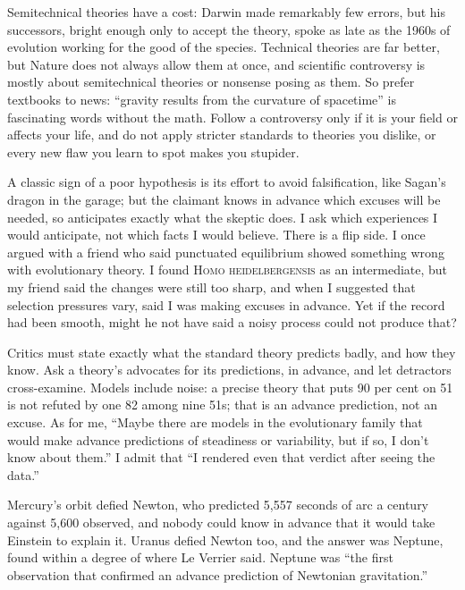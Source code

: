Semitechnical theories have a cost: Darwin made remarkably few errors, but his successors, bright enough only to accept the theory, spoke as late as the 1960s of evolution working for the good of the species. Technical theories are far better, but Nature does not always allow them at once, and scientific controversy is mostly about semitechnical theories or nonsense posing as them. So prefer textbooks to news: ``gravity results from the curvature of spacetime'' is fascinating words without the math. Follow a controversy only if it is your field or affects your life, and do not apply stricter standards to theories you dislike, or every new flaw you learn to spot makes you stupider. 

A classic sign of a poor hypothesis is its effort to avoid falsification, like Sagan's dragon in the garage; but the claimant knows in advance which excuses will be needed, so anticipates exactly what the skeptic does. I ask which experiences I would anticipate, not which facts I would believe. There is a flip side. I once argued with a friend who said punctuated equilibrium showed something wrong with evolutionary theory. I found \textsc{Homo heidelbergensis} as an intermediate, but my friend said the changes were still too sharp, and when I suggested that selection pressures vary, said I was making excuses in advance. Yet if the record had been smooth, might he not have said a noisy process could not produce that?

Critics must state exactly what the standard theory predicts badly, and how they know. Ask a theory's advocates for its predictions, in advance, and let detractors cross-examine. Models include noise: a precise theory that puts 90 per cent on 51 is not refuted by one 82 among nine 51s; that is an advance prediction, not an excuse. As for me, ``Maybe there are models in the evolutionary family that would make advance predictions of steadiness or variability, but if so, I don't know about them.'' I admit that ``I rendered even that verdict after seeing the data.'' 

Mercury's orbit defied Newton, who predicted 5,557 seconds of arc a century against 5,600 observed, and nobody could know in advance that it would take Einstein to explain it. Uranus defied Newton too, and the answer was Neptune, found within a degree of where Le Verrier said. Neptune was ``the first observation that confirmed an advance prediction of Newtonian gravitation.'' 

